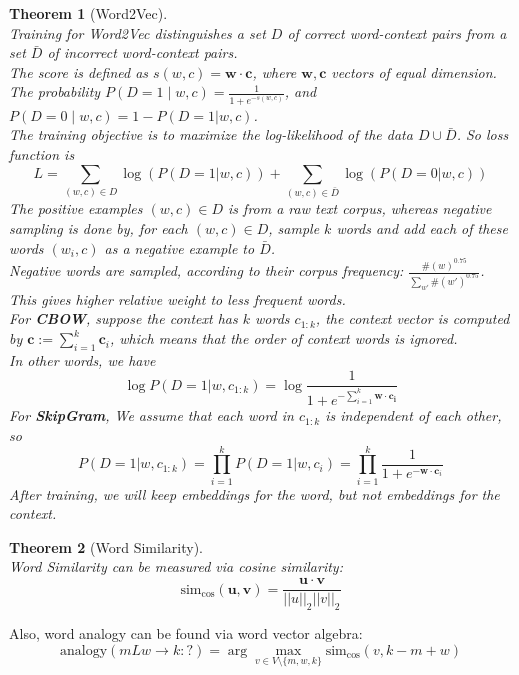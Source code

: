 \documentclass[12pt]{article}
\newtheorem{theorem}{Theorem}[section]
\theoremstyle{definition}
\begin{document}
\begin{theorem}[Word2Vec]
\hfill\\\normalfont Training for Word2Vec distinguishes a set $D$ of correct word-context pairs from a set $\bar{D}$ of incorrect word-context pairs.\\
The score is defined as $s(w,c)=\mathbf{w}\cdot\mathbf{c}$, where $\mathbf{w}, \mathbf{c}$ vectors of equal dimension.\\
The probability $P(D=1\mid w,c) = \frac{1}{1+e^{-s(w,c)}}$, and $P(D=0\mid w,c)=1-P(D=1|w,c)$.\\
The training objective is to maximize the log-likelihood of the data $D\cup \bar{D}$. So loss function is
\[
L=\sum_{(w,c)\in D}\log(P(D=1|w,c)) + \sum_{(w,c)\in \bar{D}}\log(P(D=0|w,c))
\]
The positive examples $(w,c)\in D$ is from a raw text corpus, whereas negative sampling is done by, for each $(w,c)\in D$, sample $k$ words and add each of these words $(w_i, c)$ as a negative example to $\bar{D}$.\\
Negative words are sampled, according to their corpus frequency: $\frac{\#(w)^{0.75}}{\sum_{w'}\#(w')^{0.75}}$. This gives higher relative weight to less frequent words.\\
For \textbf{CBOW}, suppose the context has $k$ words $c_{1:k}$, the context vector is computed by $\mathbf{c}:=\sum_{i=1}^k \mathbf{c}_i$, which means that the order of context words is ignored.\\
In other words, we have
\[
\log P(D=1| w, c_{1:k})=\log\frac{1}{1+e^{-\sum_{i=1}^k\mathbf{w}\cdot \mathbf{c_i}}}
\]
For \textbf{SkipGram}, We assume that each word in $c_{1:k}$ is independent of each other, so 
\[
P(D=1|w, c_{1:k})=\prod_{i=1}^k P(D=1|w, c_i) = \prod_{i=1}^k \frac{1}{1+e^{-\mathbf{w}\cdot \mathbf{c}_i}}
\]
After training, we will keep embeddings for the word, but not embeddings for the context.
\end{theorem}
\begin{theorem}[Word Similarity]
\hfill\\\normalfont Word Similarity can be measured via cosine similarity:
\[
\text{sim}_{\cos}(\mathbf{u}, \mathbf{v}) = \frac{\mathbf{u\cdot v}}{||u||_2||v||_2}
\]
\end{theorem}
Also, word analogy can be found via word vector algebra:
\[
\text{analogy}(mLw \to k: ?) = \arg\max_{v\in V\setminus\{m, w, k\}}\text{sim}_{\cos}(v, k-m+w)
\]
\clearpage
\end{document}
